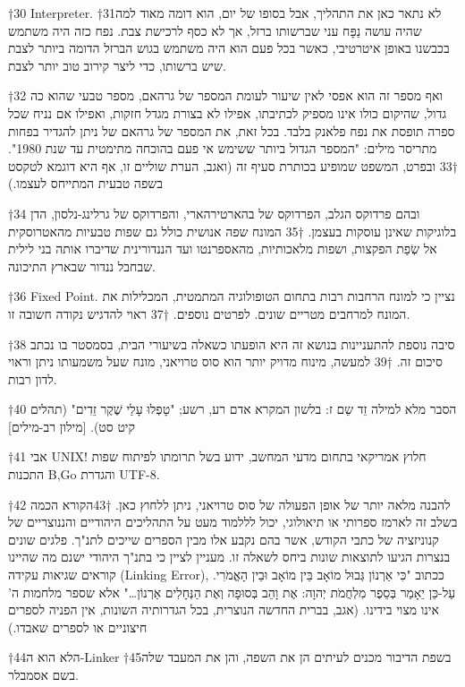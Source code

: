 †{30} Interpreter.
†{31}לא נתאר כאן את התהליך, אבל בסופו של יום, הוא דומה מאוד למה שהיה עושה נַפָּח עני שברשותו ברזל, אך לא כסף לרכישת צבת. נפח כזה היה משתמש בכבשנו באופן איטרטיבי, כאשר בכל פעם הוא היה משתמש בגוש הברזל הדומה ביותר לצבת שיש ברשותו, כדי ליצר קירוב טוב יותר לצבת.

†{32} ואף מספר זה הוא אפסי לאין שיעור לעומת המספר של גרהאם, מספר טבעי שהוא כה גדול, שהיקום כולו אינו מספיק לכתיבתו, אפילו לא בצורת מגדל חזקות, ואפילו אם נניח שכל ספרה תופסת את נפח פלאנק בלבד. בכל זאת, את המספר של גרהאם של ניתן להגדיר בפחות מתריסר מילים: "המספר הגדול ביותר ששימש אי פעם בהוכחה מתימטית עד שנת 1980".
†{33} ובפרט, המשפט שמופיע בכותרת סעיף זה (ואגב, הערת שוליים זו, אף היא דוגמא לטקסט בשפה טבעית המתייחס לעצמו.)

†{34} ובהם פרדוקס הגלב, הפרדוקס של בהארטירהארי, והפרדוקס של גרלינג-נלסון, הדן בלוגיקות שאינן עוסקות בעצמן.
†{35} המונח שפה אנושית כולל גם שפות טבעיות מהאטרוסקית אל שְׂפַת הפקצות, ושפות מלאכותיות, מהאספרנטו ועד הננדורינית שדיברו אותה בני לילית שבחבל ננדור שבארץ התיכונה.

†{36} Fixed Point. נציין כי למונח הרחבות רבות בתחום הטופולוגיה המתמטית, המכלילות את המונח למרחבים מטריים שונים. לפרטים נוספים.
†{37} ראוי להדגיש נקודה חשובה זו.

†{38} סיבה נוספת להתעניינות בנושא זה היא הופעתו כשאלה בשיעורי הבית, בסמסטר בו נכתב סיכום זה.
†{39} למעשה, מינוח מדויק יותר הוא סוס טרויאני, מונח שעל משמעותו ניתן וראוי לדון רבות.

†{40} הסבר מלא למילה זֵד שֵם ז: בלשון המקרא אדם רע, רשע; "טָפְלוּ עָלַי שֶׁקֶר זֵדִים" (תהלים קיט סט). [מילון רב-מילים]

†{41} אבי UNIX! חלוץ אמריקאי בתחום מדעי המחשב, ידוע בשל תרומתו לפיתוח שפות התכנות B,Go והגדרת UTF-8.

†{42} להבנה מלאה יותר של אופן הפעולה של סוס טרויאני, ניתן ללחוץ כאן.
†{43}הקורא הכמה בשלב זה לארמז ספרותי או תיאולוגי, יכול לללמוד מעט על התהליכים היהודיים והננוצריים של קנוניזציה של כתבי הקודש, אשר בהם נקבע אלו מבין הספרים שייכים לתנ"ך. פלגים שונים בנצרות הגיעו לתוצאות שונות ביחס לשאלה זו. מעניין לציין כי בתנ"ך היהודי ישנם מה שהיינו קוראים שגיאות עקידה (Linking Error), ככתוב "כִּי אַרְנוֹן גְּבוּל מוֹאָב בֵּין מוֹאָב וּבֵין הָאֱמֹרִי. עַל-כֵּן יֵאָמַר בְּסֵפֶר מִלְחֲמֹת יְהוָה: אֶת וָהֵב בְּסוּפָה וְאֶת הַנְּחָלִים אַרְנוֹן…" אלא שספר מלחמות ה' אינו מצוי בידינו. (אגב, בברית החדשה הנוצרית, בכל הגדרותיה השונות, אין הפניה לספרים חיצוניים או לספרים שאבדו.)

†{44}הלא הוא ה-Linker
†{45}בשפת הדיבור מכנים לעיתים הן את השפה, והן את המעבד שלה בשם אסמבלר.


